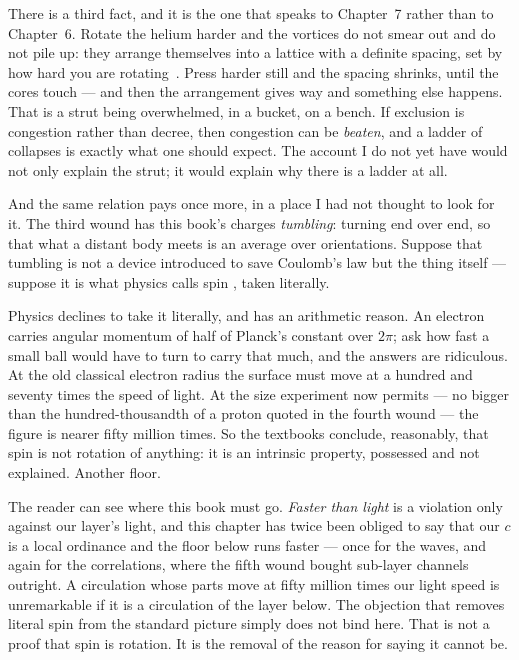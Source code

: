\documentclass[fontsize=11pt,paper=a4,pagesize=auto,parskip=half-]{scrbook}
\newcommand{\Ixtmp}{}
\DeclareRobustCommand{\Ix}[1]{%
  #1%
  \begingroup
    \lowercase{\gdef\Ixtmp{#1}}%
    \expandafter\index\expandafter{\Ixtmp}%
  \endgroup}
\begin{document}
There is a third fact, and it is the one that speaks to Chapter~7 rather than to Chapter~6. Rotate the helium harder and the vortices do not smear out and do not pile up: they arrange themselves into a lattice with a definite spacing, set by how hard you are rotating~\cite{feynman1955}. Press harder still and the spacing shrinks, until the cores touch --- and then the arrangement gives way and something else happens. That is a strut being overwhelmed, in a bucket, on a bench. If exclusion is congestion rather than decree, then congestion can be \emph{beaten}, and a ladder of collapses is exactly what one should expect. The account I do not yet have would not only explain the strut; it would explain why there is a ladder at all.

And the same relation pays once more, in a place I had not thought to look for it. The third wound has this book's charges \emph{tumbling}: turning end over end, so that what a distant body meets is an average over orientations. Suppose that tumbling is not a device introduced to save Coulomb's law but the thing itself --- suppose it is what physics calls \Ix{spin}, taken literally.

Physics declines to take it literally, and has an arithmetic reason. An electron carries angular momentum of half of Planck's constant over $2\pi$; ask how fast a small ball would have to turn to carry that much, and the answers are ridiculous. At the old classical electron radius the surface must move at a hundred and seventy times the speed of light. At the size experiment now permits --- no bigger than the hundred-thousandth of a proton quoted in the fourth wound --- the figure is nearer fifty million times. So the textbooks conclude, reasonably, that spin is not rotation of anything: it is an intrinsic property, possessed and not explained. Another floor.

The reader can see where this book must go. \emph{Faster than light} is a violation only against our layer's light, and this chapter has twice been obliged to say that our $c$ is a local ordinance and the floor below runs faster --- once for the waves, and again for the correlations, where the fifth wound bought sub-layer channels outright. A circulation whose parts move at fifty million times our light speed is unremarkable if it is a circulation of the layer below. The objection that removes literal spin from the standard picture simply does not bind here. That is not a proof that spin is rotation. It is the removal of the reason for saying it cannot be.
\end{document}
